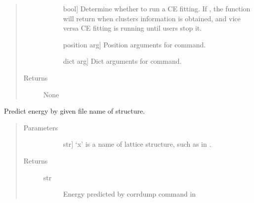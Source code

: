 \documentclass[letterpaper,10pt,english]{sphinxmanual}
\begin{document}
\begin{fulllineitems}
\begin{fulllineitems}
\begin{quote}
\begin{description}
\begin{description}
\item[{}] \leavevmode{[}bool{]}
\sphinxAtStartPar
Determine whether to run a CE fitting. If , the function
will return when clusters information is obtained, and vice versa
CE fitting is running until users stop it.

\item[{}] \leavevmode{[}position arg{]}
\sphinxAtStartPar
Position arguments for  command.

\item[{}] \leavevmode{[}dict arg{]}
\sphinxAtStartPar
Dict arguments for  command.

\end{description}

\item[{Returns}] \leavevmode\begin{description}
\item[{None}] \leavevmode
\end{description}

\end{description}\end{quote}

\end{fulllineitems}


\begin{fulllineitems}
\label{\detokenize{pygace:pygace.ce.CE.predict}}
\sphinxAtStartPar
Predict energy by given file name of structure.
\begin{quote}\begin{description}
\item[{Parameters}] \leavevmode\begin{description}
\item[{}] \leavevmode{[}str{]}
\sphinxAtStartPar
‘x’ is a name of lattice structure, such as  in .

\end{description}

\item[{Returns}] \leavevmode\begin{description}
\item[{str}] \leavevmode
\sphinxAtStartPar
Energy predicted by corrdump command in 

\end{description}

\end{description}\end{quote}

\end{fulllineitems}


\end{fulllineitems}
\end{document}
